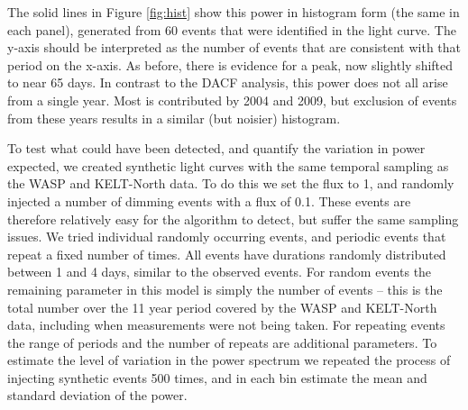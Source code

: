 \documentclass[]{rsos}
\begin{document}


The solid lines in Figure \ref{fig:hist} show this power in histogram form (the same in
each panel), generated from 60 events that were identified in the light curve. The y-axis
should be interpreted as the number of events that are consistent with that period on the
x-axis. As before, there is evidence for a peak, now slightly shifted to near 65 days. In
contrast to the DACF analysis, this power does not all arise from a single year. Most is
contributed by 2004 and 2009, but exclusion of events from these years results in a
similar (but noisier) histogram.

To test what could have been detected, and quantify the variation in power expected,
we created synthetic light curves with the same temporal sampling as the WASP and
KELT-North data. To do this we set the flux to 1, and randomly injected a number of
dimming events with a flux of 0.1. These events are therefore relatively easy for the
algorithm to detect, but suffer the same sampling issues. We tried individual randomly
occurring events, and periodic events that repeat a fixed number of times. All events
have durations randomly distributed between 1 and 4 days, similar to the observed
events. For random events the remaining parameter in this model is simply the number of
events -- this is the total number over the 11 year period covered by the WASP and
KELT-North data, including when measurements were not being taken. For repeating events
the range of periods and the number of repeats are additional parameters. To estimate the
level of variation in the power spectrum we repeated the process of injecting synthetic
events 500 times, and in each bin estimate the mean and standard deviation of the power.
\end{document}
